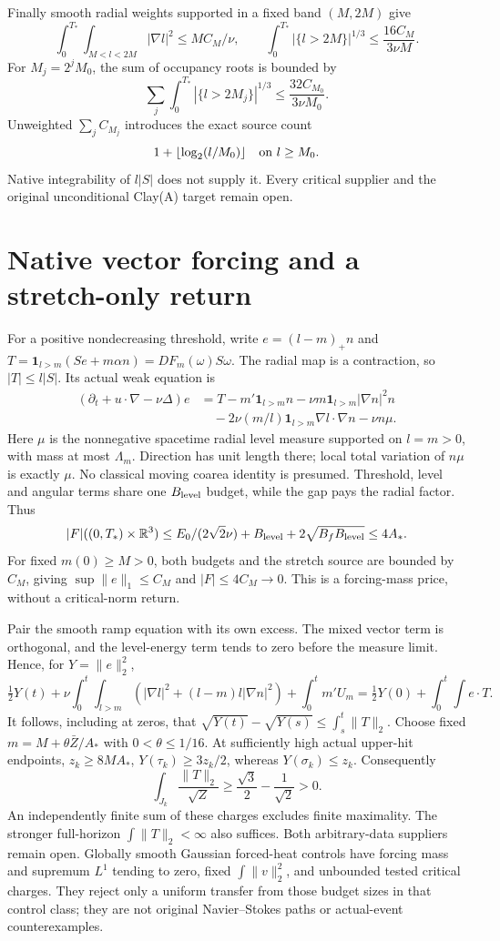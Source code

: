\documentclass[11pt]{article}
\begin{document}
Finally smooth radial weights supported in a fixed band $(M,2M)$ give
\[
 \int_0^{T_*}\!\int_{M<l<2M}|\nabla l|^2\le MC_M/\nu,
 \qquad \int_0^{T_*}|\{l>2M\}|^{1/3}\le\frac{16C_M}{3\nu M}.
\]
For $M_j=2^jM_0$, the sum of occupancy roots is bounded by
\[
 \sum_j\int_0^{T_*}|\{l>2M_j\}|^{1/3}
 \le\frac{32C_{M_0}}{3\nu M_0}.
\]
Unweighted $\sum_j C_{M_j}$ introduces the exact source count
\[
 1+\lfloor\log_2(l/M_0)\rfloor\quad\hbox{on }l\ge M_0.
\]
Native integrability of $l|S|$ does not supply it. Every critical
supplier and the original unconditional Clay(A) target remain open.

\section{Native vector forcing and a stretch-only return}
For a positive nondecreasing threshold, write $e=(l-m)_+n$ and
$T=\mathbf1_{l>m}(Se+m\alpha n)=DF_m(\omega)S\omega$.
The radial map is a contraction, so $|T|\le l|S|$. Its actual weak equation is
\begin{align*}
 (\partial_t+u\cdot\nabla-\nu\Delta)e
 &=T-m'\mathbf1_{l>m}n-\nu m\mathbf1_{l>m}|\nabla n|^2n\\
 &\quad-2\nu(m/l)\mathbf1_{l>m}\nabla l\cdot\nabla n-\nu n\mu.
\end{align*}
Here $\mu$ is the nonnegative spacetime radial level measure supported on
$l=m>0$, with mass at most $\Lambda_m$. Direction has unit length there;
local total variation of $n\mu$ is exactly $\mu$. No classical moving
coarea identity is presumed. Threshold, level and angular terms share
one $B_{\rm level}$ budget, while the gap pays the radial factor. Thus
\[
 |F|((0,T_*)\times\mathbb R^3)
 \le E_0/(2\sqrt2\nu)+B_{\rm level}
                 +2\sqrt{B_fB_{\rm level}}\le4A_*.
\]
For fixed $m(0)\ge M>0$, both budgets and the stretch source are bounded
by $C_M$, giving $\sup\|e\|_1\le C_M$ and $|F|\le4C_M\to0$.
This is a forcing-mass price, without a critical-norm return.

Pair the smooth ramp equation with its own excess. The mixed vector term
is orthogonal, and the level-energy term tends to zero before the measure
limit. Hence, for $Y=\|e\|_2^2$,
\[
 \tfrac12Y(t)+\nu\int_0^t\!\int_{l>m}
 (|\nabla l|^2+(l-m)l|\nabla n|^2)+\int_0^tm'U_m
 =\tfrac12Y(0)+\int_0^t\!\int e\cdot T.
\]
It follows, including at zeros, that
$\sqrt{Y(t)}-\sqrt{Y(s)}\le\int_s^t\|T\|_2$.
Choose fixed $m=M+\theta\bar Z/A_*$ with $0<\theta\le1/16$.
At sufficiently high actual upper-hit endpoints, $z_k\ge8MA_*$,
$Y(\tau_k)\ge3z_k/2$, whereas $Y(\sigma_k)\le z_k$. Consequently
\[
 \int_{J_k}\frac{\|T\|_2}{\sqrt Z}
 \ge\frac{\sqrt3}{2}-\frac1{\sqrt2}>0.
\]
An independently finite sum of these charges excludes finite maximality.
The stronger full-horizon $\int\|T\|_2<\infty$ also suffices. Both
arbitrary-data suppliers remain open. Globally smooth Gaussian forced-heat
controls have forcing mass and supremum $L^1$ tending to zero, fixed
$\int\|v\|_2^2$, and unbounded tested critical charges. They reject only a
uniform transfer from those budget sizes in that control class; they are
not original Navier--Stokes paths or actual-event counterexamples.
\end{document}
